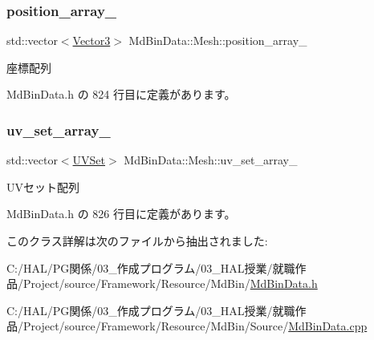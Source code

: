 \subsubsection{\texorpdfstring{position\+\_\+array\+\_\+}{position\_array\_}}
{\footnotesize\ttfamily std\+::vector$<$\mbox{\hyperlink{class_md_bin_data_1_1_vector3}{Vector3}}$>$ Md\+Bin\+Data\+::\+Mesh\+::position\+\_\+array\+\_\+\hspace{0.3cm}{\ttfamily [private]}}



座標配列 



 Md\+Bin\+Data.\+h の 824 行目に定義があります。

\mbox{\label{class_md_bin_data_1_1_mesh_a50d8ce29adc888bbc28405870b6bdb2e}} 
\subsubsection{\texorpdfstring{uv\+\_\+set\+\_\+array\+\_\+}{uv\_set\_array\_}}
{\footnotesize\ttfamily std\+::vector$<$\mbox{\hyperlink{class_md_bin_data_1_1_mesh_1_1_u_v_set}{U\+V\+Set}}$>$ Md\+Bin\+Data\+::\+Mesh\+::uv\+\_\+set\+\_\+array\+\_\+\hspace{0.3cm}{\ttfamily [private]}}



U\+Vセット配列 



 Md\+Bin\+Data.\+h の 826 行目に定義があります。



このクラス詳解は次のファイルから抽出されました\+:\begin{DoxyCompactItemize}
\item 
C\+:/\+H\+A\+L/\+P\+G関係/03\+\_\+作成プログラム/03\+\_\+\+H\+A\+L授業/就職作品/\+Project/source/\+Framework/\+Resource/\+Md\+Bin/\mbox{\hyperlink{_md_bin_data_8h}{Md\+Bin\+Data.\+h}}\item 
C\+:/\+H\+A\+L/\+P\+G関係/03\+\_\+作成プログラム/03\+\_\+\+H\+A\+L授業/就職作品/\+Project/source/\+Framework/\+Resource/\+Md\+Bin/\+Source/\mbox{\hyperlink{_md_bin_data_8cpp}{Md\+Bin\+Data.\+cpp}}\end{DoxyCompactItemize}

